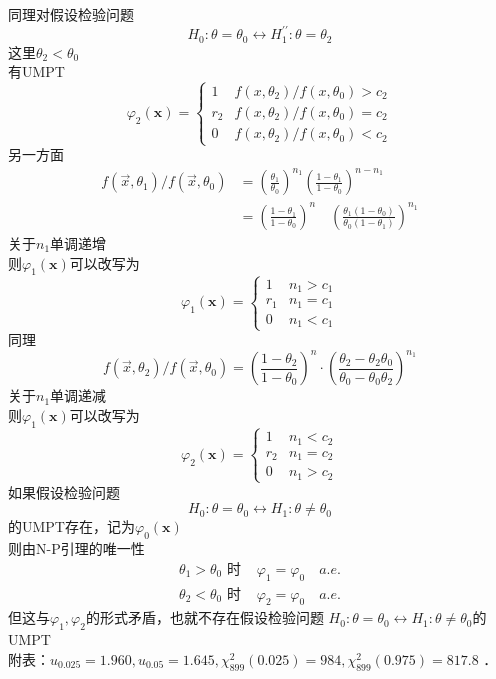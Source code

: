 \documentclass[UTF8,openany]{book}
\begin{document}
	同理对假设检验问题
	\[
	H_0:\theta=\theta_0 \leftrightarrow H_1^{\prime \prime}:\theta=\theta_2
	\]
	这里$\theta_2<\theta_0$\\
	有UMPT
	\[
	\varphi_2(\boldsymbol{x})= 
	\begin{cases}
		1 & f\left(x, \theta_2\right) / f\left(x, \theta_0\right)>c_2 \\ 
		r_2 & f\left( x, \theta_2 \right) /f\left(x, \theta_0\right)=c_2 \\ 
		0 & f\left(x, \theta_2\right) / f\left(x, \theta_0\right) <c_2
	\end{cases}
	\]
	另一方面
	\[
	\begin{aligned}
		f(\vec{x},\theta_1)/f(\vec{x},\theta_0)&=\left(\frac{\theta_1}{\theta_0} \right)^{n_1} \left(\frac{1-\theta_1}{1-\theta_0}\right)^{n-n_1}\\
		&=\left(\frac{1-\theta_1}{1-\theta_0}\right)^n \quad\left(\frac{\theta_1\left(1-\theta_0\right)}{\theta_0\left(1-\theta_{1}\right)}\right)^{n_1} 
	\end{aligned}
	\]
	关于$n_1$单调递增\\
	则$\varphi_1(\boldsymbol{x})$可以改写为
	\[
	\varphi_1(\boldsymbol{x})= \begin{cases}1 & n_1>c_1 \\ r_1 & n_1=c_1 \\ 0 & n_1<c_1\end{cases}
	\]
	同理
	\[
	f(\vec{x},\theta_2)/f(\vec{x},\theta_0)=\left(\frac{1-\theta_2}{1-\theta_0}\right)^n \cdot\left(\frac{\theta_2-\theta_2 \theta_0}{\theta_0-\theta_0 \theta_2}\right)^{n_1}
	\]
	关于$n_1$单调递减\\
	则$\varphi_1(\boldsymbol{x})$可以改写为
	\[
	\varphi_2(\boldsymbol{x})= \begin{cases}1 & n_1<c_2 \\ r_2 & n_1=c_2 \\ 0 & n_1>c_2\end{cases}
	\]
	如果假设检验问题
	\[
	H_0: \theta=\theta_0 \leftrightarrow H_1: \theta \neq \theta_0
	\]
	的UMPT存在，记为$\varphi_0(\boldsymbol{x})$\\
	则由N-P引理的唯一性\\
	\[
	\begin{array}{ll}
		\theta_1>\theta_0 \text { 时} & \varphi_1=\varphi_0 \quad a.e.\\
		\theta_2<\theta_0 \text { 时 } & \varphi_2=\varphi_0 \quad a.e.
	\end{array}
	\]
	但这与$\varphi_1,\varphi_2$的形式矛盾，也就不存在假设检验问题 $H_0: \theta=\theta_0 \leftrightarrow H_1: \theta \neq \theta_0$的UMPT\\
	
	
	
	
	\noindent 附表：$u_{0.025}=1.960, u_{0.05}=1.645, \chi_{899}^2(0.025)=984, \chi_{899}^2(0.975)=817.8$ ．
\end{document}
